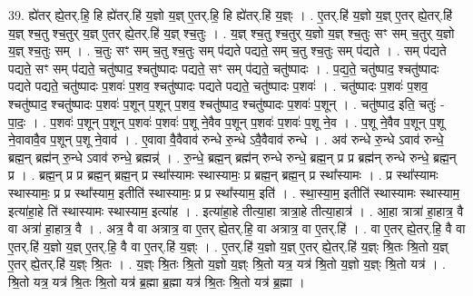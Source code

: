 \documentclass[17pt]{extarticle}
\begin{document}
39. ह्ये॑तर् ह्ये॒तर्.हि॒ हि ह्ये॑तर्.हि॑ य॒ज्ञो य॒ज्ञ् ए॒तर्.हि॒ हि ह्ये॑तर्.हि॑ य॒ज्ञ्ः । . ए॒तर्.हि॑ य॒ज्ञो य॒ज्ञ् ए॒तर् ह्ये॒तर्.हि॑ य॒ज्ञ् श्च॒तु श्च॒तुर् य॒ज्ञ् ए॒तर् ह्ये॒तर्.हि॑ य॒ज्ञ् श्च॒तुः । . य॒ज्ञ् श्च॒तु श्च॒तुर् य॒ज्ञो य॒ज्ञ् श्च॒तुः सꣳ सम् च॒तुर् य॒ज्ञो य॒ज्ञ् श्च॒तुः सम् । . च॒तुः सꣳ सम् च॒तु श्च॒तुः सम् प॑द्यते पद्यते॒ सम् च॒तु श्च॒तुः सम् प॑द्यते । . सम् प॑द्यते पद्यते॒ सꣳ सम् प॑द्यते॒ चतु॑ष्पाद॒ श्चतु॑ष्पादः पद्यते॒ सꣳ सम् प॑द्यते॒ चतु॑ष्पादः । . प॒द्य॒ते॒ चतु॑ष्पाद॒ श्चतु॑ष्पादः पद्यते पद्यते॒ चतु॑ष्पादः प॒शवः॑ प॒शव॒ श्चतु॑ष्पादः पद्यते पद्यते॒ चतु॑ष्पादः प॒शवः॑ । . चतु॑ष्पादः प॒शवः॑ प॒शव॒ श्चतु॑ष्पाद॒ श्चतु॑ष्पादः प॒शवः॑ प॒शून् प॒शून् प॒शव॒ श्चतु॑ष्पाद॒ श्चतु॑ष्पादः प॒शवः॑ प॒शून् । . चतु॑ष्पाद॒ इति॒ चतुः॑ - पा॒दः॒ । . प॒शवः॑ प॒शून् प॒शून् प॒शवः॑ प॒शवः॑ प॒शू ने॒वैव प॒शून् प॒शवः॑ प॒शवः॑ प॒शू ने॒व । . प॒शू ने॒वैव प॒शून् प॒शू ने॒वावावै॒व प॒शून् प॒शू ने॒वाव॑ । . ए॒वावा वै॒वैवाव॑ रुन्धे रु॒न्धे ऽवै॒वैवाव॑ रुन्धे । . अव॑ रुन्धे रु॒न्धे ऽवाव॑ रुन्धे॒ ब्रह्म॒न् ब्रह्म॑न् रु॒न्धे ऽवाव॑ रुन्धे॒ ब्रह्मन्न्॑ । . रु॒न्धे॒ ब्रह्म॒न् ब्रह्म॑न् रुन्धे रुन्धे॒ ब्रह्म॒न् प्र प्र ब्रह्म॑न् रुन्धे रुन्धे॒ ब्रह्म॒न् प्र । . ब्रह्म॒न् प्र प्र ब्रह्म॒न् ब्रह्म॒न् प्र स्था᳚स्यामः स्थास्यामः॒ प्र ब्रह्म॒न् ब्रह्म॒न् प्र स्था᳚स्यामः । . प्र स्था᳚स्यामः स्थास्यामः॒ प्र प्र स्था᳚स्याम॒ इतीति॑ स्थास्यामः॒ प्र प्र स्था᳚स्याम॒ इति॑ । . स्था॒स्या॒म॒ इतीति॑ स्थास्यामः स्थास्याम॒ इत्या॑हा॒हे ति॑ स्थास्यामः स्थास्याम॒ इत्या॑ह । . इत्या॑हा॒हे तीत्या॒हा त्रात्रा॒हे तीत्या॒हात्र॑ । . आ॒हा त्रात्रा॑ हा॒हात्र॒ वै वा अत्रा॑ हा॒हात्र॒ वै । . अत्र॒ वै वा अत्रात्र॒ वा ए॒तर् ह्ये॒तर्.हि॒ वा अत्रात्र॒ वा ए॒तर्.हि॑ । . वा ए॒तर् ह्ये॒तर्.हि॒ वै वा ए॒तर्.हि॑ य॒ज्ञो य॒ज्ञ् ए॒तर्.हि॒ वै वा ए॒तर्.हि॑ य॒ज्ञ्ः । . ए॒तर्.हि॑ य॒ज्ञो य॒ज्ञ् ए॒तर् ह्ये॒तर्.हि॑ य॒ज्ञ्ः श्रि॒तः श्रि॒तो य॒ज्ञ् ए॒तर् ह्ये॒तर्.हि॑ य॒ज्ञ्ः श्रि॒तः । . य॒ज्ञ्ः श्रि॒तः श्रि॒तो य॒ज्ञो य॒ज्ञ्ः श्रि॒तो यत्र॒ यत्र॑ श्रि॒तो य॒ज्ञो य॒ज्ञ्ः श्रि॒तो यत्र॑ । . श्रि॒तो यत्र॒ यत्र॑ श्रि॒तः श्रि॒तो यत्र॑ ब्र॒ह्मा ब्र॒ह्मा यत्र॑ श्रि॒तः श्रि॒तो यत्र॑ ब्र॒ह्मा । \newline
\pagebreak
{}
\end{document}
